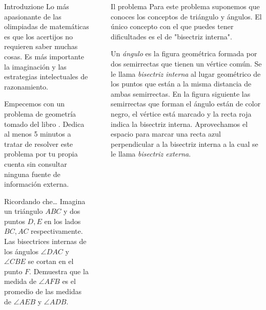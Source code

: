 \documentclass[final]{beamer}
\newlength{\sepwid}
\newlength{\onecolwid}
\newlength{\twocolwid}
\begin{document}
\begin{frame}[t]
\begin{columns}[t]
\begin{column}{\onecolwid}
\begin{block}{Introduzione}
Lo más apasionante de las olimpiadas de matemáticas es que los acertijos no requieren saber muchas cosas. Es más importante la imaginación y las estrategias intelectuales de razonamiento.

Empecemos con un problema de geometría tomado del libro \cite{Posamentier:CPIG}. Dedica al menos 5 minutos a tratar de resolver este problema por tu propia cuenta sin consultar ninguna fuente de información externa.

\end{block}

\begin{alertblock}{Ricordando che\dots}
Imagina un triángulo $ABC$ y dos puntos $D, E$ en los lados $BC, AC$ respectivamente.
Las bisectrices internas de los ángulos $\angle DAC$ y $\angle CBE$ se cortan en el punto $F$.
Demuestra que la medida de $\angle AFB$ es el promedio de las medidas de $\angle AEB$ y $\angle ADB$.
\end{alertblock}

\end{column} %

\begin{column}{\sepwid}\end{column} %

\begin{column}{\onecolwid} %



\begin{block}{Il problema}
Para este problema suponemos que conoces los conceptos de triángulo y ángulos. El único concepto con el que puedes tener dificultades es el de "bisectriz interna". 

Un \emph{ángulo} es la figura geométrica formada por dos semirrectas que tienen un vértice común. Se le llama \emph{bisectriz interna} al lugar geométrico de los puntos que están a la misma distancia de ambas semirrectas. En la figura siguiente las semirrectas que forman el ángulo están de color negro, el vértice está marcado y la recta roja indica la bisectriz interna. Aprovechamos el espacio para marcar una recta azul perpendicular a la bisectriz interna a la cual se le llama \emph{bisectriz externa}.



\end{block}
\end{column}
\end{columns}
\end{frame}
\end{document}
